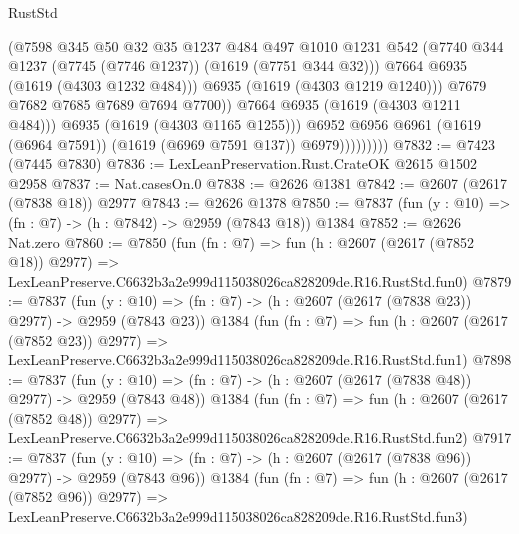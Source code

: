 \begin{lexlean}{RustStd}
\begin{coremodule}
                                (@7598
                                  @345
                                  @50
                                  @32
                                  @35
                                  @1237
                                  @484
                                  @497
                                  @1010
                                  @1231
                                  @542
                                  (@7740 @344 @1237 (@7745 (@7746 @1237)) (@1619 (@7751 @344 @32)))
                                  @7664
                                  @6935
                                  (@1619 (@4303 @1232 @484)))
                                @6935
                                (@1619 (@4303 @1219 @1240)))
                              @7679
                              @7682
                              @7685
                              @7689
                              @7694
                              @7700))
                          @7664
                          @6935
                          (@1619 (@4303 @1211 @484)))
                        @6935
                        (@1619 (@4303 @1165 @1255)))
                      @6952
                      @6956
                      @6961
                      (@1619 (@6964 @7591))
                      (@1619 (@6969 @7591 @137))
                      @6979)))))))))
@7832 := @7423 (@7445 @7830)
@7836 := LexLeanPreservation.Rust.CrateOK @2615 @1502 @2958
@7837 := Nat.casesOn.{0}
@7838 := @2626 @1381
@7842 := @2607 (@2617 (@7838 @18)) @2977
@7843 := @2626 @1378
@7850 := @7837 (fun (y : @10) => (fn : @7) -> (h : @7842) -> @2959 (@7843 @18)) @1384
@7852 := @2626 Nat.zero
@7860 := @7850
    (fun (fn : @7) =>
    fun (h : @2607 (@2617 (@7852 @18)) @2977) =>
    LexLeanPreserve.C6632b3a2e999d115038026ca828209de.R16.RustStd.fun0)
@7879 := @7837
    (fun (y : @10) => (fn : @7) -> (h : @2607 (@2617 (@7838 @23)) @2977) -> @2959 (@7843 @23))
    @1384
    (fun (fn : @7) =>
    fun (h : @2607 (@2617 (@7852 @23)) @2977) =>
    LexLeanPreserve.C6632b3a2e999d115038026ca828209de.R16.RustStd.fun1)
@7898 := @7837
    (fun (y : @10) => (fn : @7) -> (h : @2607 (@2617 (@7838 @48)) @2977) -> @2959 (@7843 @48))
    @1384
    (fun (fn : @7) =>
    fun (h : @2607 (@2617 (@7852 @48)) @2977) =>
    LexLeanPreserve.C6632b3a2e999d115038026ca828209de.R16.RustStd.fun2)
@7917 := @7837
    (fun (y : @10) => (fn : @7) -> (h : @2607 (@2617 (@7838 @96)) @2977) -> @2959 (@7843 @96))
    @1384
    (fun (fn : @7) =>
    fun (h : @2607 (@2617 (@7852 @96)) @2977) =>
    LexLeanPreserve.C6632b3a2e999d115038026ca828209de.R16.RustStd.fun3)

\end{coremodule}
\end{lexlean}
